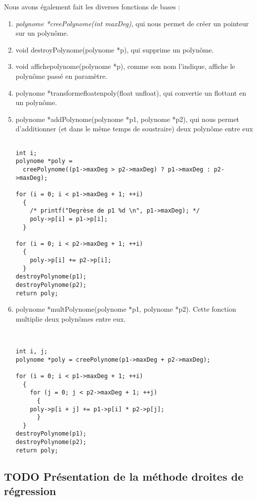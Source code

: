 \documentclass[letter]{article}
\begin{document}
Nous avons également fait les diverses fonctions de bases :
\begin{enumerate}
\item \emph{polynome *creePolynome(int maxDeg)}, qui nous permet de créer un pointeur sur un polynôme.
\item void destroyPolynome(polynome *p), qui supprime un polynôme.
\item void affichepolynome(polynome *p), comme son nom l'indique, affiche le polynôme passé en paramètre.
\item polynome *transformefloatenpoly(float unfloat), qui convertie un flottant en un polynôme.
\item polynome *addPolynome(polynome *p1, polynome *p2), qui nous permet d'additionner (et dans le même temps de soustraire) deux polynôme entre eux

\begin{verbatim}

int i;
polynome *poly =
  creePolynome((p1->maxDeg > p2->maxDeg) ? p1->maxDeg : p2->maxDeg);

for (i = 0; i < p1->maxDeg + 1; ++i)
  {
    /* printf("Degrèse de p1 %d \n", p1->maxDeg); */
    poly->p[i] = p1->p[i];
  }

for (i = 0; i < p2->maxDeg + 1; ++i)
  {
    poly->p[i] += p2->p[i];
  }
destroyPolynome(p1);
destroyPolynome(p2);
return poly;

\end{verbatim}
\item polynome *multPolynome(polynome *p1, polynome *p2). Cette fonction multiplie deux polynômes entre eux.

\begin{verbatim}


int i, j;
polynome *poly = creePolynome(p1->maxDeg + p2->maxDeg);

for (i = 0; i < p1->maxDeg + 1; ++i)
  {
    for (j = 0; j < p2->maxDeg + 1; ++j)
      {
	poly->p[i + j] += p1->p[i] * p2->p[j];
      }
  }
destroyPolynome(p1);
destroyPolynome(p2);
return poly;

\end{verbatim}
\end{enumerate}








\subsection{{\bfseries\sffamily TODO} Présentation de la méthode droites de régression}
\label{sec:org0de4b8c}
\end{document}
